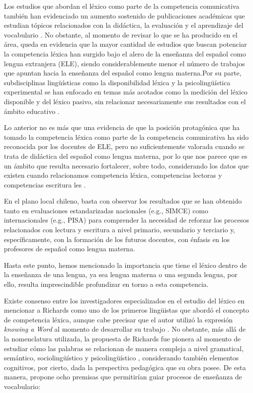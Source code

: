 \documentclass{textolivre}
\begin{document}
Los estudios que abordan el léxico como parte de la competencia
comunicativa también han evidenciado un aumento sostenido de publicaciones
académicas que estudian tópicos relacionados con la didáctica, la evaluación y
el aprendizaje del vocabulario \cite{perfetti2001,rufat2016}. No
obstante, al momento de revisar lo que se ha producido en el área, queda en
evidencia que la mayor cantidad de estudios que buscan potenciar la competencia
léxica han surgido bajo el alero de la enseñanza del español como lengua
extranjera (ELE), siendo considerablemente menor el número de trabajos que
apuntan hacia la enseñanza del español como lengua materna.Por su parte,
subdisciplinas lingüísticas como la disponibilidad léxica y la
psicolingüística experimental se han enfocado en temas más acotados como la
medición del léxico disponible y del léxico pasivo, sin relacionar
necesariamente sus resultados con el ámbito educativo \cite{GermanyG2000,echeverria1987,RiffoOcares2014}.

Lo anterior no es más que una evidencia de que la posición protagónica que
ha tomado la competencia léxica como parte de la competencia comunicativa ha
sido reconocida por los docentes de ELE, pero no suficientemente valorada cuando
se trata de didáctica del español como lengua materna, por lo que nos parece que
es un ámbito que resulta necesario fortalecer, sobre todo, considerando los
datos que existen cuando relacionamos competencia léxica, competencias lectoras
y competencias escritura les \cite{GonzaloZapico2016,Zapico2017,kaur,Pinto2019}.

En el plano local chileno, basta con observar los resultados que se han
obtenido tanto en evaluaciones estandarizadas nacionales (e.g., SIMCE) como
internacionales (e.g., PISA) \cite{VillarroelHenrquez2015,FigueroaSeplveda2018}
para comprender la necesidad de reforzar los procesos relacionados
con lectura y escritura a nivel primario, secundario y terciario y,
específicamente, con la formación de los futuros docentes, con énfasis en los
profesores de español como lengua materna.

Hasta este punto, hemos mencionado la importancia que tiene el léxico dentro de
la enseñanza de una lengua, ya sea lengua materna o una segunda lengua, por
ello, resulta imprescindible profundizar en torno a esta competencia.

Existe consenso entre los investigadores especializados en el estudio del
léxico en mencionar a Richards como uno de los primeros lingüistas que abordó
el concepto de competencia léxica, aunque cabe precisar que el autor utilizó la
expresión \textit{knowing a Word} al momento de desarrollar su trabajo \cite{Richards1976,Choudhury2015,Velsquez2016}.
No obstante, más allá de la nomenclatura
utilizada, la propuesta de Richards fue pionera al momento de estudiar cómo las
palabras se relacionan de manera compleja a nivel gramatical, semántico,
sociolingüístico y psicolingüístico \cite{catalan2002}, considerando
también elementos cognitivos, por cierto, dada la perspectiva pedagógica que su
obra posee. De esta manera, \textcite[p. 78--83]{Richards1976} propone ocho premisas que
permitirían guiar procesos de enseñanza de vocabulario:
\end{document}
